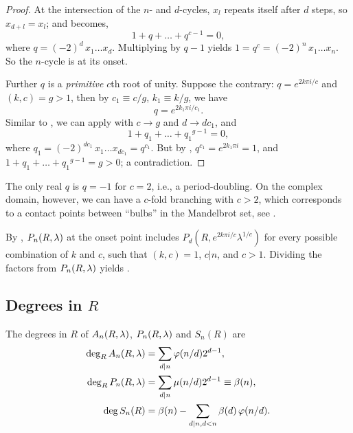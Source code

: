 \documentclass[twocolumn]{revtex4-1}
\begin{document}
\begin{proof}
%
At the intersection of the $n$- and $d$-cycles,
  $x_l$ repeats itself after $d$ steps, so
  $x_{d + l} = x_l$;
and  becomes,
%
\begin{equation}
  1 + q + \dots + q^{c-1} = 0,
\label{eq:cbifur}
\end{equation}
%
where $q = (-2)^d \, x_1 \dots x_d$.
%
Multiplying  by $q - 1$ yields
  $1 = q^c = (-2)^n \, x_1 \dots x_n$.
So the $n$-cycle is at its onset.


Further $q$ is a \emph{primitive} $c$th root of unity.
%
Suppose the contrary: $q = e^{2k\pi i/c}$ and $(k, c) = g >1$,
  then by $c_1 \equiv c/g$, $k_1 \equiv k/g$, we have
\begin{equation}
  q = e^{2k_1\pi i/ c_1}.
\label{eq:qd}
\end{equation}
Similar to , we can apply  with $c \rightarrow g$ and $d \rightarrow d c_1$, and
\[
  1 + q_1 + \dots + {q_1}^{g-1} = 0,
\]
  where $q_1 = (-2)^{d c_1} \, x_1 \dots x_{dc_1} = q^{c_1}$.
But by , $q^{c_1} = e^{2 k_1\pi i} = 1$,
and $1 + q_1 + \dots + {q_1}^{g-1} = g > 0$; a contradiction.
%
\end{proof}


\begin{remark}
The only real $q$ is $q = -1$ for $c=2$, i.e., a period-doubling.
%
On the complex domain, however, we can have a $c$-fold branching with $c>2$,
  which corresponds to a contact points between ``bulbs''
  in the Mandelbrot set, see .
\end{remark}


By , $P_n(R, \lambda)$ at the onset point
includes $P_d(R, e^{2 k \pi i/c} \lambda^{1/c})$ for every
  possible combination of $k$ and $c$, such that
  $(k, c) = 1$, $c|n$, and $c > 1$.
%
Dividing the factors from $P_n(R, \lambda)$ yields .










\subsection{\label{sec:degR}Degrees in $R$}



\begin{theorem}
The degrees in $R$ of $A_n(R, \lambda)$, $P_n(R, \lambda)$ and $S_n(R)$ are
\begin{subequations}
\begin{align}
\deg_R A_n(R, \lambda) &= \sum_{d|n} \varphi(n/d) 2^{d-1}, \\
\deg_R P_n(R, \lambda) &= \sum_{d|n} \mu(n/d) 2^{d-1} \equiv \beta(n), \\
\deg S_n(R) &= \beta(n) - \sum_{d | n, d < n} \beta(d) \, \varphi(n/d).
\end{align}
\label{eq:degR}
\end{subequations}
\label{thm:degR}
\end{theorem}
\end{document}

